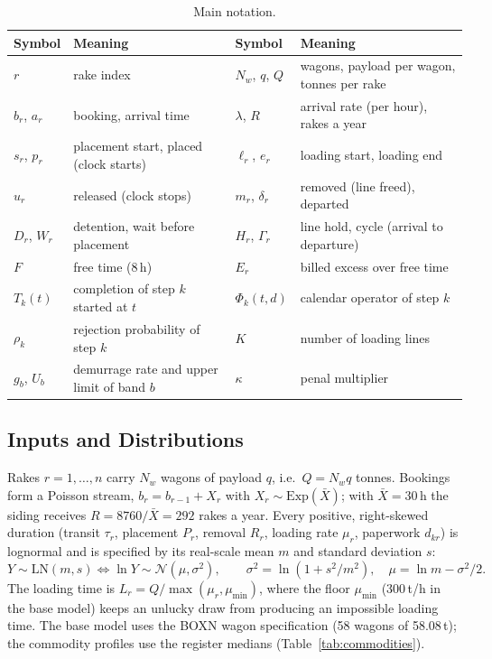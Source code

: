 \begin{table}[!htbp]
\centering
\caption[Main notation]{Main notation.}
\label{tab:notation}
\small
\begin{tabularx}{\textwidth}{@{}l X l X@{}}
\toprule
\textbf{Symbol} & \textbf{Meaning} & \textbf{Symbol} & \textbf{Meaning} \\
\midrule
$r$ & rake index & $N_w$, $q$, $Q$ & wagons, payload per wagon, tonnes per rake \\
$b_r$, $a_r$ & booking, arrival time & $\lambda$, $R$ & arrival rate (per hour), rakes a year \\
$s_r$, $p_r$ & placement start, placed (clock starts) & $\ell_r$, $e_r$ & loading start, loading end \\
$u_r$ & released (clock stops) & $m_r$, $\delta_r$ & removed (line freed), departed \\
$D_r$, $W_r$ & detention, wait before placement & $H_r$, $\Gamma_r$ & line hold, cycle (arrival to departure) \\
$F$ & free time (8\,h) & $E_r$ & billed excess over free time \\
$T_k(t)$ & completion of step $k$ started at $t$ & $\Phi_k(t,d)$ & calendar operator of step $k$ \\
$\rho_k$ & rejection probability of step $k$ & $K$ & number of loading lines \\
$g_b$, $U_b$ & demurrage rate and upper limit of band $b$ & $\kappa$ & penal multiplier \\
\bottomrule
\end{tabularx}
\end{table}

\subsection{Inputs and Distributions}
Rakes $r = 1,\dots,n$ carry $N_w$ wagons of payload $q$, i.e.\ $Q = N_w q$ tonnes. Bookings form a Poisson stream, $b_r = b_{r-1} + X_r$ with $X_r \sim \mathrm{Exp}(\bar X)$; with $\bar X = 30$\,h the siding receives $R = 8760/\bar X = 292$ rakes a year. Every positive, right-skewed duration (transit $\tau_r$, placement $P_r$, removal $R_r$, loading rate $\mu_r$, paperwork $d_{kr}$) is lognormal and is specified by its real-scale mean $m$ and standard deviation $s$:
\begin{equation}
Y \sim \mathrm{LN}(m,s) \iff \ln Y \sim \mathcal{N}(\mu, \sigma^2), \qquad \sigma^2 = \ln\!\left(1 + s^2/m^2\right), \quad \mu = \ln m - \sigma^2/2 .
\label{eq:logn}
\end{equation}
The loading time is $L_r = Q / \max(\mu_r, \mu_{\min})$, where the floor $\mu_{\min}$ (300\,t/h in the base model) keeps an unlucky draw from producing an impossible loading time. The base model uses the BOXN wagon specification (58 wagons of 58.08\,t); the commodity profiles use the register medians (Table~\ref{tab:commodities}).

